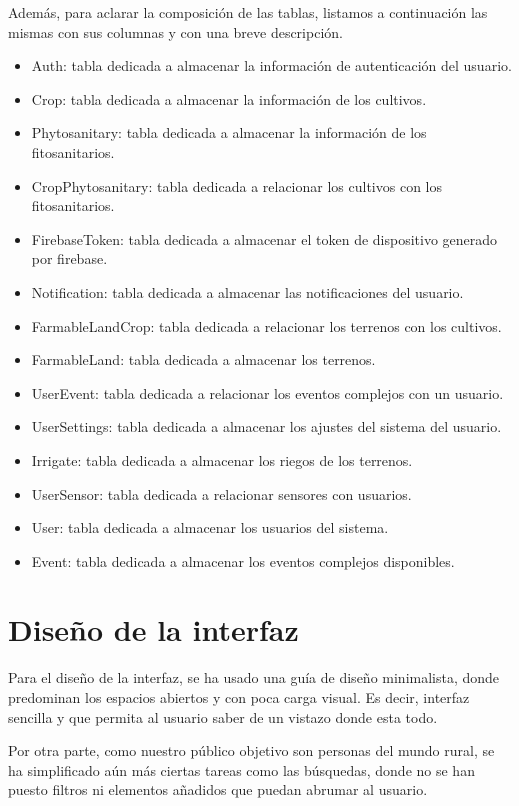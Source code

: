 Además, para aclarar la composición de las tablas, listamos a continuación las mismas con sus columnas y con una breve descripción.

\begin{itemize}
    \item Auth: tabla dedicada a almacenar la información de autenticación del usuario.
    \item Crop: tabla dedicada a almacenar la información de los cultivos.
    \item Phytosanitary: tabla dedicada a almacenar la información de los fitosanitarios.
    \item CropPhytosanitary: tabla dedicada a relacionar los cultivos con los fitosanitarios.
    \item FirebaseToken: tabla dedicada a almacenar el token de dispositivo generado por firebase.
    \item Notification: tabla dedicada a almacenar las notificaciones del usuario.
    \item FarmableLandCrop: tabla dedicada a relacionar los terrenos con los cultivos.
    \item FarmableLand: tabla dedicada a almacenar los terrenos.
    \item UserEvent: tabla dedicada a relacionar los eventos complejos con un usuario.
    \item UserSettings: tabla dedicada a almacenar los ajustes del sistema del usuario.
    \item Irrigate: tabla dedicada a almacenar los riegos de los terrenos.
    \item UserSensor: tabla dedicada a relacionar sensores con usuarios.
    \item User: tabla dedicada a almacenar los usuarios del sistema.
    \item Event: tabla dedicada a almacenar los eventos complejos disponibles.
\end{itemize}

\section{Diseño de la interfaz}
Para el diseño de la interfaz, se ha usado una guía de diseño minimalista, donde predominan los espacios abiertos y con poca carga visual. Es decir, interfaz sencilla y que permita al usuario saber de un vistazo donde esta todo.

Por otra parte, como nuestro público objetivo son personas del mundo rural, se ha simplificado aún más ciertas tareas como las búsquedas, donde no se han puesto filtros ni elementos añadidos que puedan abrumar al usuario.

